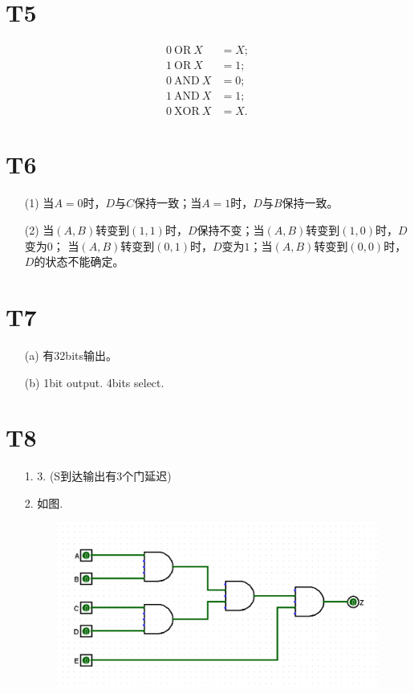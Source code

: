 \documentclass{article}
\begin{document}
\section*{T5}
\begin{align*}
    0\ \mbox{OR}\ X& = X;\\
    1\ \mbox{OR}\ X& = 1;\\
    0\ \mbox{AND}\ X& = 0;\\
    1\ \mbox{AND}\ X& = 1;\\
    0\ \mbox{XOR}\ X& = X.
\end{align*}

\section*{T6}
    \begin{enumerate}
        \item [(1)]当$A=0$时，$D$与$C$保持一致；当$A=1$时，$D$与$B$保持一致。
        \item [(2)]当$(A,B)$转变到$(1,1)$时，$D$保持不变；当$(A,B)$转变到$(1,0)$时，$D$变为$0$；
        当$(A,B)$转变到$(0,1)$时，$D$变为$1$；当$(A,B)$转变到$(0,0)$时，$D$的状态不能确定。
    \end{enumerate}
\section*{T7}
    \begin{enumerate}
        \item [(a)]有32bits输出。
        \item [(b)]1bit output. 4bits select.
    \end{enumerate}

\section*{T8}
    \begin{enumerate}
        \item [1.]3. (S到达输出有3个门延迟)
        \item [2.]如图.
        \begin{figure}[htbp]
            \centering
            \includegraphics[scale=0.5]{picture/T82.png}
        \end{figure}
    \end{enumerate}
\end{document}
